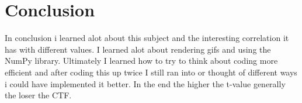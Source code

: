 \documentclass[letterpaper]{article}
\begin{document}
\section{Conclusion}
In conclusion i learned alot about this subject and the interesting correlation it has with different values.  I learned alot about rendering gifs and using the NumPy library.  Ultimately I learned how to try to think about coding more efficient and after coding this up twice I still ran into or thought of different ways i could have implemented it better.  In the end the higher the t-value generally the loser the CTF.



\end{document}
